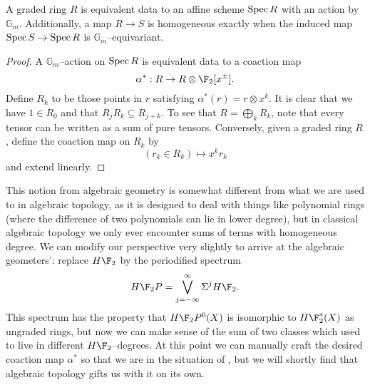 \begin{lemma}\label{GradedAndGmEquivAgree}
A graded ring $R$ is equivalent data to an affine scheme $\operatorname{Spec} R$ with an action by $\mathbb G_m$.  Additionally, a map $R \to S$ is homogeneous exactly when the induced map $\operatorname{Spec} S \to \operatorname{Spec} R$ is $\mathbb G_m$--equivariant.
\end{lemma}
\begin{proof}
A $\mathbb G_m$--action on $\operatorname{Spec} R$ is equivalent data to a coaction map \[\alpha^*: R \to R \otimes \F_2[x^\pm].\]  Define $R_k$ to be those points in $r$ satisfying $\alpha^*(r) = r \otimes x^k$.  It is clear that we have $1 \in R_0$ and that $R_j R_k \subseteq R_{j+k}$.  To see that $R = \bigoplus_k R_k$, note that every tensor can be written as a sum of pure tensors.  Conversely, given a graded ring $R$, define the coaction map on $R_k$ by \[(r_k \in R_k) \mapsto x^k r_k\] and extend linearly.
\end{proof}

This notion from algebraic geometry is somewhat different from what we are used to in algebraic topology, as it is designed to deal with things like polynomial rings (where the difference of two polynomials can lie in lower degree), but in classical algebraic topology we only ever encounter sums of terms with homogeneous degree.  We can modify our perspective very slightly to arrive at the algebraic geometers': replace $H\F_2$ by the periodified spectrum \[H\F_2P = \bigvee_{j=-\infty}^\infty \Susp^j H\F_2.\]  This spectrum has the property that $H\F_2P^0(X)$ is isomorphic to $H\F_2^*(X)$ as ungraded rings, but now we can make sense of the sum of two classes which used to live in different $H\F_2$--degrees.  At this point we can manually craft the desired coaction map $\alpha^*$ so that we are in the situation of , but we will shortly find that algebraic topology gifts us with it on its own.


